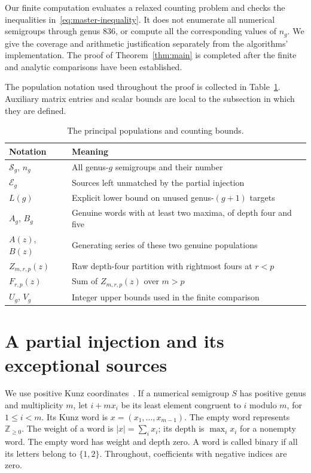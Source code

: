 \documentclass[11pt]{amsart}
\theoremstyle{definition}
\theoremstyle{remark}
\numberwithin{equation}{section}
\begin{document}
Our finite computation evaluates a relaxed counting problem and checks
the inequalities in~\eqref{eq:master-inequality}. It does not enumerate
all numerical semigroups through genus $836$, or compute all the
corresponding values of $n_g$. We give the coverage and arithmetic
justification separately from the algorithms' implementation.
The proof of Theorem~\ref{thm:main} is completed after the finite and
analytic comparisons have been established.


The population notation used throughout the proof is collected in
Table~\ref{tab:notation}. Auxiliary matrix entries and scalar bounds are
local to the subsection in which they are defined.

\begin{table}[ht]
\centering
\caption{The principal populations and counting bounds.}
\label{tab:notation}
\begin{tabular}{@{}lp{.72\linewidth}@{}}
\toprule
Notation & Meaning\\
\midrule
$\mathcal S_g$, $n_g$ & All genus-$g$ semigroups and their number\\
$\mathcal E_g$ & Sources left unmatched by the partial injection\\
$L(g)$ & Explicit lower bound on unused genus-$(g+1)$ targets\\
$A_g$, $B_g$ & Genuine words with at least two maxima, of depth four and five\\
$A(z)$, $B(z)$ & Generating series of these two genuine populations\\
$Z_{m,r,p}(z)$ & Raw depth-four partition with rightmost fours at $r<p$\\
$F_{r,p}(z)$ & Sum of $Z_{m,r,p}(z)$ over $m>p$\\
$U_g$, $V_g$ & Integer upper bounds used in the finite comparison\\
\bottomrule
\end{tabular}
\end{table}



\section{A partial injection and its exceptional sources}
\label{cmb:injection}

We use positive Kunz coordinates~\cite{Kunz,Rosales}. If a numerical semigroup $S$ has positive
genus and multiplicity $m$, let $i+mx_i$ be its least element congruent to
$i$ modulo $m$, for $1\le i<m$. Its Kunz word is
$x=(x_1,\ldots,x_{m-1})$. The empty word represents $\mathbb Z_{\ge0}$.
The weight of a word is $|x|=\sum_i x_i$; its depth is $\max_i x_i$
for a nonempty word. The empty word has weight and depth zero.
A word is called binary if all its letters belong to $\{1,2\}$.
Throughout, coefficients with negative indices are zero.
\end{document}
